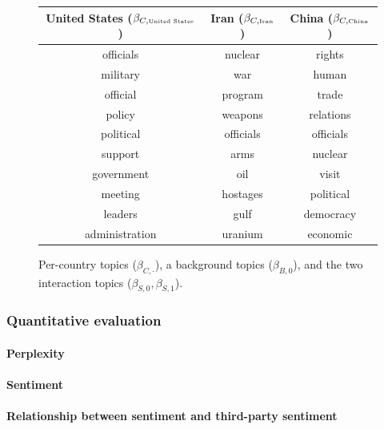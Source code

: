 \begin{figure}
\begin{tabular}{|c|c|c|}
  \textbf{United States ($\beta_{C,\mbox{\tiny United States}}$)} &
  \textbf{Iran ($\beta_{C,\mbox{\tiny Iran}}$)} &
  \textbf{China ($\beta_{C,\mbox{\tiny China}}$)} \\
  \hline
  officials & nuclear & rights \\
  military & war & human \\
  official & program & trade \\
  policy & weapons & relations \\
  political & officials & officials \\
  support & arms & nuclear \\
  government & oil & visit \\
  meeting & hostages & political \\
  leaders & gulf & democracy \\
  administration & uranium & economic \\
  \hline
\end{tabular}
\caption{Per-country topics ($\beta_{C,\cdot}$), a background topics ($\beta_{B,0}$), and the two interaction topics ($\beta_{S,0}, \beta_{S,1}$).}
\label{table:fr_unsupervised_topics}
\end{figure}


\subsubsection*{Quantitative evaluation}
\paragraph{Perplexity}
\paragraph{Sentiment}

\paragraph{Relationship between sentiment and third-party sentiment}


